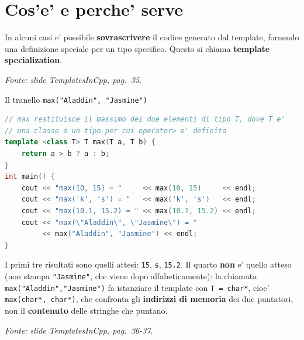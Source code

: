 \documentclass{report}
\newcommand{\code}[1]{\texttt{\small #1}}
\newcommand{\fonteslide}[1]{{\footnotesize\itshape\color{gray} Fonte: slide \emph{TemplatesInCpp}, pag.~#1.\par}}
\begin{document}
\section{Cos'e' e perche' serve}

In alcuni casi e' possibile \textbf{sovrascrivere} il codice generato dal
template, fornendo una definizione speciale per un tipo specifico. Questo si
chiama \textbf{template specialization}.

\fonteslide{35}


\begin{Example}{Il tranello \code{max("Aladdin", "Jasmine")}}{}
\begin{lstlisting}[language=C++]
// max restituisce il massimo dei due elementi di tipo T, dove T e'
// una classe o un tipo per cui operator> e' definito
template <class T> T max(T a, T b) {
    return a > b ? a : b;
}
int main() {
    cout << "max(10, 15) = "     << max(10, 15)     << endl;
    cout << "max('k', 's') = "   << max('k', 's')   << endl;
    cout << "max(10.1, 15.2) = " << max(10.1, 15.2) << endl;
    cout << "max(\"Aladdin\", \"Jasmine\") = "
         << max("Aladdin", "Jasmine") << endl;
}
\end{lstlisting}
I primi tre risultati sono quelli attesi: \code{15}, \code{s}, \code{15.2}.
Il quarto \textbf{non} e' quello atteso (non stampa \code{"Jasmine"}, che
viene dopo alfabeticamente): la chiamata \code{max("Aladdin","Jasmine")} fa
istanziare il template con \code{T = char*}, cioe' \code{max(char*, char*)},
che confronta gli \textbf{indirizzi di memoria} dei due puntatori, non il
\textbf{contenuto} delle stringhe che puntano.
\end{Example}

\fonteslide{36-37}
\end{document}
